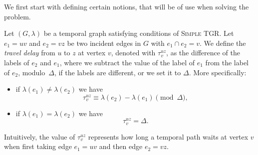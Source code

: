 \documentclass[a4paper,UKenglish,cleveref, autoref, thm-restate]{lipics-v2021}
\newcommand{\deltaExact}{\textsc{Simple TGR}}
\begin{document}
We first start with defining certain notions, that will be of use when solving the problem.

    \begin{definition} \label{def:travel-delay}
    Let $(G, \lambda)$ be a temporal graph satisfying conditions of \deltaExact.
    Let $e_1=uv$ and $e_2=vz$ be two incident edges in $G$ with $e_1 \cap e_2 = v$.
    We define the \emph{travel delay} from $u$ to $z$ at vertex $v$, denoted with $\tau_v^{uz}$,
    as the difference of the labels of $e_2$ and $e_1$, where we subtract the value of the label of $e_1$ from the label of $e_2$,  modulo~$\Delta$, if the labels are different, or we set it to $\Delta$.
    More specifically:
    \begin{itemize}
        \item if $\lambda(e_1) \neq \lambda(e_2)$ we have
    \begin{equation}\label{eq:def-VertexWaitingTime}
       \tau_v^{uz} \equiv \lambda (e_2) - \lambda(e_1) \pmod \Delta,
    \end{equation}
    \item if $\lambda(e_1) = \lambda(e_2)$ we have
    \begin{equation*}
    \tau_v^{uz} = \Delta.
    \end{equation*}
    \end{itemize}
    \end{definition}
    Intuitively, the value of $\tau_v^{uz}$ represents how long a temporal path waits at vertex $v$ when first taking edge $e_1=uv$ and then edge $e_2 = vz$.
\end{document}

